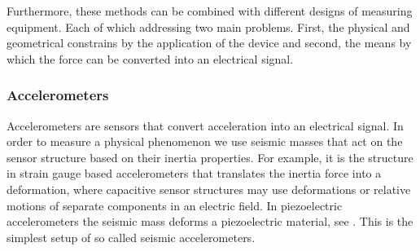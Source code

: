 Furthermore, these methods can be combined with different designs of measuring equipment. Each of which addressing two main problems. First, the physical and geometrical constrains by the application of the device and second, the means by which the force can be converted into an electrical signal.

\subsubsection{Accelerometers}

Accelerometers are sensors that convert acceleration into an electrical signal. In order to measure a physical phenomenon we use seismic masses that act on the sensor structure based on their inertia properties. For example, it is the structure in strain gauge based accelerometers that translates the inertia force into a deformation, where capacitive sensor structures may use deformations or relative motions of separate components in an electric field. In piezoelectric accelerometers the seismic mass deforms a piezoelectric material, see . This is the simplest setup of so called seismic accelerometers.
\\[4ex]
